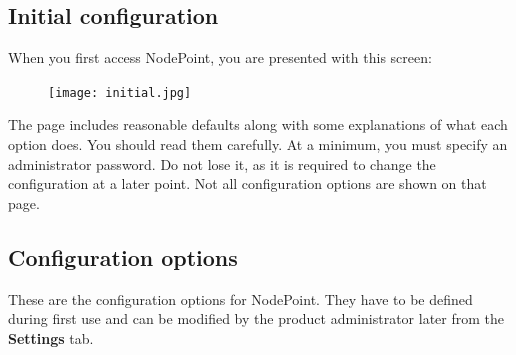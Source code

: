 \documentclass[11pt]{article}
\begin{document}
\subsection{Initial configuration}
When you first access NodePoint, you are presented with this screen:

\begin{figure}[h]
\texttt{[image: initial.jpg]}
\end{figure}

The page includes reasonable defaults along with some explanations of what each option does. You should read them carefully. At a minimum, you must specify an administrator password. Do not lose it, as it is required to change the configuration at a later point. Not all configuration options are shown on that page.

\subsection{Configuration options}

These are the configuration options for NodePoint. They have to be defined during first use and can be modified by the product administrator later from the \textbf{Settings} tab.
\end{document}
